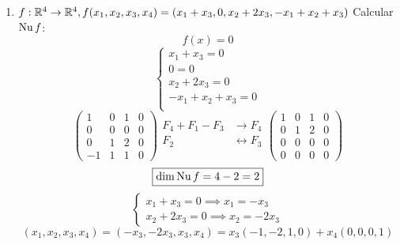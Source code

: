 \documentclass[../practica.root.tex]{subfiles}
\begin{document}
\begin{enumerate}
\begin{enumerate}
              \item \( f : \mathbb{R}^4 \to \mathbb{R}^4, f(x_1,x_2,x_3,x_4) = (x_1 + x_3, 0, x_2 + 2x_3, -x_1 + x_2 + x_3) \)
                    Calcular \(\operatorname{Nu} f\):
                    \[ f(x) = 0 \]
                    \[
                        \begin{cases}
                            x_1 + x_3 = 0        \\
                            0 = 0                \\
                            x_2 + 2x_3 = 0       \\
                            -x_1 + x_2 + x_3 = 0 \\
                        \end{cases}
                    \] \[
                        \begin{pmatrix}
                            1  & 0 & 1 & 0 \\
                            0  & 0 & 0 & 0 \\
                            0  & 1 & 2 & 0 \\
                            -1 & 1 & 1 & 0
                        \end{pmatrix}
                        \begin{array}{rl}
                            F_4 + F_1 - F_3 & \to F_4             \\
                            F_2             & \leftrightarrow F_3 \\
                        \end{array}
                        \begin{pmatrix}
                            1 & 0 & 1 & 0 \\
                            0 & 1 & 2 & 0 \\
                            0 & 0 & 0 & 0 \\
                            0 & 0 & 0 & 0
                        \end{pmatrix}
                    \] \[
                        \boxed{\dim \operatorname{Nu} f = 4 - 2 = 2}
                    \] \[
                        \begin{cases}
                            x_1 + x_3 = 0 \implies x_1 = -x_3 \\
                            x_2 + 2x_3 = 0 \implies x_2 = -2x_3
                        \end{cases}
                    \] \[
                        (x_1, x_2, x_3, x_4) = (-x_3, -2x_3, x_3, x_4) = x_3(-1,-2,1,0) + x_4(0,0,0,1)
\]
\end{enumerate}
\end{enumerate}
\end{document}
